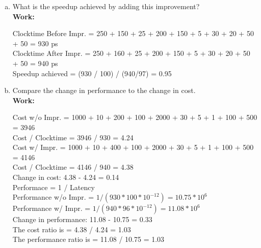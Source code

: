 \documentclass[11pt]{article}
\begin{document}
\begin{enumerate}[(a)]
    \item What is the speedup achieved by adding this improvement?\\
    \textbf{Work:}
    \begin{center}
        Clocktime Before Impr. = 250 + 150 + 25 + 200 + 150 + 5 + 30 + 20 + 50 + 50 = 930 ps\\
        Clocktime After Impr. = 250 + 160 + 25 + 200 + 150 + 5 + 30 + 20 + 50 + 50 = 940 ps\\
        Speedup achieved = (930 / 100) / (940/97) = 0.95\\
    \end{center}

    \item Compare the change in performance to the change in cost.\\
    \textbf{Work:}
    \begin{center}
        Cost w/o Impr. = 1000 + 10 + 200 + 100 + 2000 + 30 + 5 + 1 + 100 + 500 = 3946\\
        Cost / Clocktime = 3946 / 930 = 4.24\\
        Cost w/ Impr. = 1000 + 10 + 400 + 100 + 2000 + 30 + 5 + 1 + 100 + 500 = 4146\\
        Cost / Clocktime = 4146 / 940 = 4.38\\
        Change in cost: 4.38 - 4.24 = 0.14\\[0.15in]
        Performace = 1 / Latency\\
        Performance w/o Impr. = $1 / (930 * 100 * 10^{-12}) = 10.75 * 10^6$\\
        Performance w/ Impr. = $1 / (940 * 96 * 10^{-12}) = 11.08 * 10^6$\\
        Change in performance: 11.08 - 10.75 = 0.33\\[0.15in]
        The cost ratio is = 4.38 / 4.24 = 1.03\\
        The performance ratio is = 11.08 / 10.75 = 1.03\\[0.15in]
    \end{center}
    

\end{enumerate}
\end{document}
